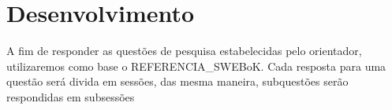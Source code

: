 \chapter[Desenvolvimento ]{Desenvolvimento}

A fim de responder as questões de pesquisa estabelecidas pelo orientador,
utilizaremos como base o REFERENCIA\_SWEBoK. Cada resposta para uma questão será divida em sessões, das mesma maneira, subquestões
serão respondidas em subsessões

